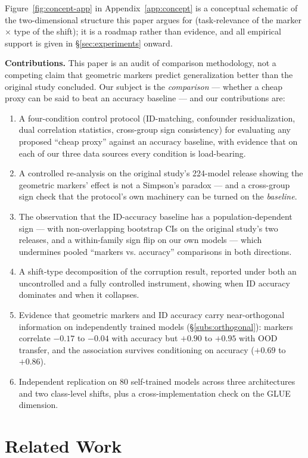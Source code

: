 \documentclass[10pt]{article} %
\newcommand{\srcref}[1]{\S\ref{#1}}
\begin{document}
Figure~\ref{fig:concept-app} in Appendix~\ref{app:concept} is a conceptual schematic of the two-dimensional structure this paper argues for (task-relevance of the marker $\times$ type of the shift); it is a roadmap rather than evidence, and all empirical support is given in \srcref{sec:experiments} onward.

\textbf{Contributions.} This paper is an audit of comparison methodology, not a competing claim that geometric markers predict generalization better than the original study concluded. Our subject is the \emph{comparison} --- whether a cheap proxy can be said to beat an accuracy baseline --- and our contributions are:
\begin{enumerate}
\item A four-condition control protocol (ID-matching, confounder residualization, dual correlation statistics, cross-group sign consistency) for evaluating any proposed ``cheap proxy'' against an accuracy baseline, with evidence that on each of our three data sources every condition is load-bearing.
\item A controlled re-analysis on the original study's 224-model release showing the geometric markers' effect is not a Simpson's paradox --- and a cross-group sign check that the protocol's own machinery can be turned on the \emph{baseline}.
\item The observation that the ID-accuracy baseline has a population-dependent sign --- with non-overlapping bootstrap CIs on the original study's two releases, and a within-family sign flip on our own models --- which undermines pooled ``markers vs. accuracy'' comparisons in both directions.
\item A shift-type decomposition of the corruption result, reported under both an uncontrolled and a fully controlled instrument, showing when ID accuracy dominates and when it collapses.
\item Evidence that geometric markers and ID accuracy carry near-orthogonal information on independently trained models (\srcref{subs:orthogonal}): markers correlate $-0.17$ to $-0.04$ with accuracy but $+0.90$ to $+0.95$ with OOD transfer, and the association survives conditioning on accuracy ($+0.69$ to $+0.86$).
\item Independent replication on 80 self-trained models across three architectures and two class-level shifts, plus a cross-implementation check on the GLUE dimension.
\end{enumerate}

\section{Related Work}
\label{sec:related}
\end{document}
